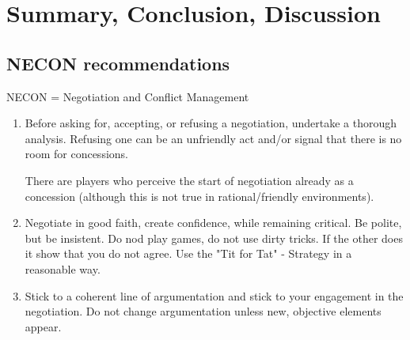 \section{Summary, Conclusion, Discussion}

\subsection{NECON recommendations}

NECON = Negotiation and Conflict Management

\begin{enumerate}
    \item Before asking for, accepting, or refusing a negotiation, undertake a thorough
        analysis. Refusing one can be an unfriendly act and/or signal that there is
        no room for concessions.

        There are players who perceive the start of negotiation already as a concession
        (although this is not true in rational/friendly environments).
    
    \item Negotiate in good faith, create confidence, while remaining critical. Be
        polite, but be insistent. Do nod play games, do not use dirty tricks. If
        the other does it show that you do not agree. Use the "Tit for Tat" -
        Strategy in a reasonable way.

    \item Stick to a coherent line of argumentation and stick to your engagement
        in the negotiation. Do not change argumentation unless new, objective
        elements appear.


\end{enumerate}
